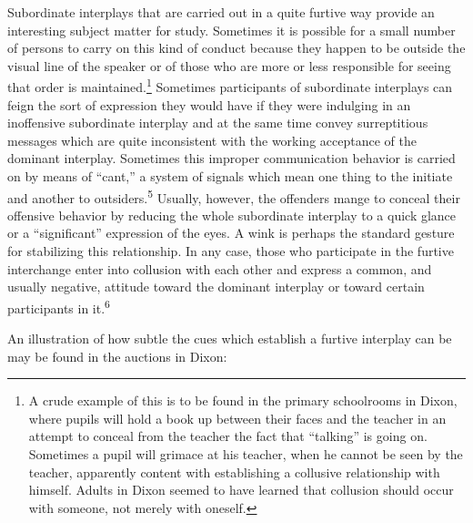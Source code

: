 \documentclass[twoside,symmetric,nobib,justified]{tufte-book}
\begin{document}
Subordinate interplays that are carried out in a quite furtive way
provide an interesting subject matter for study. Sometimes it is
possible for a small number of persons to carry on this kind of conduct
because they happen to be outside the visual line of the speaker or of
those who are more or less responsible for seeing that order is
maintained.\footnote{A crude example of this is to be found in the
  primary schoolrooms in Dixon, where pupils will hold a book up between
  their faces and the teacher in an attempt to conceal from the teacher
  the fact that ``talking'' is going on. Sometimes a pupil will grimace
  at his teacher, when he cannot be seen by the teacher, apparently
  content with establishing a collusive relationship with himself.
  Adults in Dixon seemed to have learned that collusion should occur
  with someone, not merely with oneself.} Sometimes participants of
subordinate interplays can feign the sort of expression they would have
if they were indulging in an inoffensive subordinate interplay and at
the same time convey surreptitious messages which are quite inconsistent
with the working acceptance of the dominant interplay. Sometimes this
improper communication behavior is carried on by means of ``cant,'' a
system of signals which mean one thing to the initiate and another to
outsiders.\textsuperscript{5} Usually, however, the
offenders mange to conceal their offensive behavior by reducing the
whole subordinate interplay to a quick glance or a ``significant''
expression of the eyes. A wink is perhaps the standard gesture for
stabilizing this relationship. In any case, those who participate in the
furtive interchange enter into collusion with each other and express a
common, and usually negative, attitude toward the dominant interplay or
toward certain participants in it.\textsuperscript{6}

An illustration of how subtle the cues which establish a furtive
interplay can be may be found in the auctions in Dixon:
\end{document}
